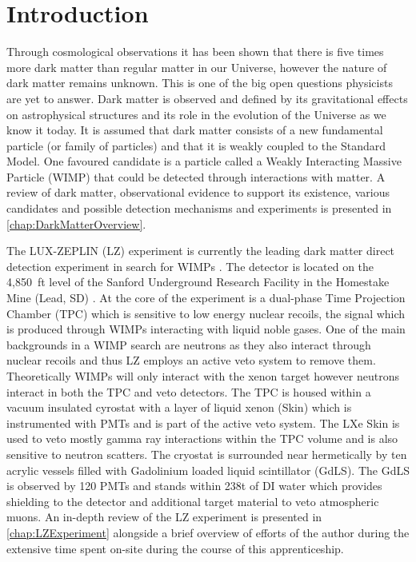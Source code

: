 \chapter{Introduction}
Through cosmological observations it has been shown that there is five times more dark matter than regular matter in our Universe, however the nature of dark matter remains unknown. This is one of the big open questions physicists are yet to answer. Dark matter is observed and defined by its gravitational effects on astrophysical structures and its role in the evolution of the Universe as we know it today. It is assumed that dark matter consists of a new fundamental particle (or family of particles) and that it is weakly coupled to the Standard Model. One favoured candidate is a particle called a Weakly Interacting Massive Particle (WIMP) that could be detected through interactions with matter. A review of dark matter, observational evidence to support its existence, various candidates and possible detection mechanisms and experiments is presented in \autoref{chap:DarkMatterOverview}.

The LUX-ZEPLIN (LZ) experiment is currently the leading dark matter direct detection experiment in search for WIMPs \cite{LZCollaboration:2024lux}. The detector is located on the 4,850~ft level of the Sanford Underground Research Facility in the Homestake Mine (Lead, SD) \cite{LZNIMA}. At the core of the experiment is a dual-phase Time Projection Chamber (TPC) which is sensitive to low energy nuclear recoils, the signal which is produced through WIMPs interacting with liquid noble gases. One of the main backgrounds in a WIMP search are neutrons as they also interact through nuclear recoils and thus LZ employs an active veto system to remove them. Theoretically WIMPs will only interact with the xenon target however neutrons interact in both the TPC and veto detectors. The TPC is housed within a vacuum insulated cyrostat with a layer of liquid xenon (Skin) which is instrumented with PMTs and is part of the active veto system. The LXe Skin is used to veto mostly gamma ray interactions within the TPC volume and is also sensitive to neutron scatters. The cryostat is surrounded near hermetically by ten acrylic vessels filled with  Gadolinium loaded liquid scintillator (GdLS). The GdLS is observed by 120 PMTs and stands within 238t of DI water which provides shielding to the detector and additional target material to veto atmospheric muons. An in-depth review of the LZ experiment is presented in \autoref{chap:LZExperiment} alongside a brief overview of efforts of the author during the extensive time spent on-site during the course of this apprenticeship. 

